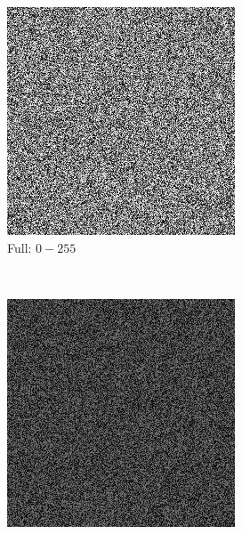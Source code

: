 \documentclass{report}
\begin{document}
\begin{figure}[H]
        \centering
        \begin{subfigure}[b]{0.2\textwidth}
                \includegraphics[width=\textwidth]{graphics/randomFullSpace.png}
                \caption{Full: $0-255$}
        \end{subfigure}
        ~~~
        \begin{subfigure}[b]{0.2\textwidth}
        		\includegraphics[width=\textwidth]{graphics/randomBottomHalfSpace.png}

\end{subfigure}
\end{figure}
\end{document}

